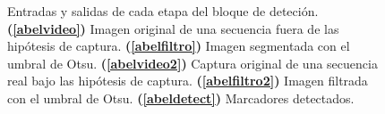 \begin{figure}[ht!]
        \hspace{1 mm}
        \hspace{1 mm}
      \caption{Entradas y salidas de cada etapa del bloque de deteción. \textbf{(\ref{abelvideo})} Imagen original de una secuencia fuera de las hipótesis de captura. \textbf{(\ref{abelfiltro})} Imagen segmentada con el umbral de Otsu. \textbf{(\ref{abelvideo2})} Captura original de una secuencia real bajo las hipótesis de captura. \textbf{(\ref{abelfiltro2})} Imagen filtrada con el umbral de Otsu. \textbf{(\ref{abeldetect})} Marcadores detectados.}  
      \label{ejemploabelumbr2}
\end{figure}

